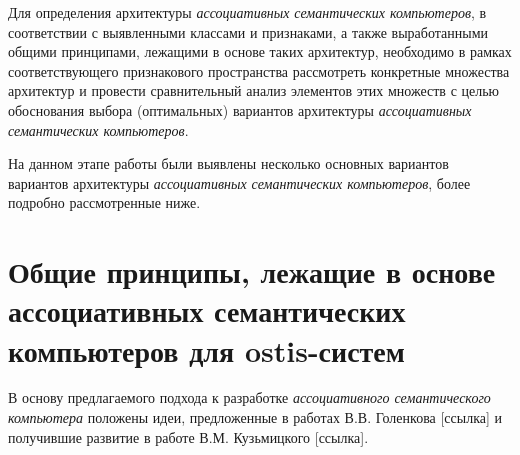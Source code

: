 \begin{SCn}
\begin{scnsubdividing}
\begin{scnindent}
		\end{scnindent}			
	\end{scnsubdividing}
	\begin{scnsubdividing}
		\begin{scnindent}
		\end{scnindent}
	\end{scnsubdividing}
\end{SCn}

Для определения архитектуры \textit{ассоциативных семантических компьютеров}, в соответствии с выявленными классами и признаками, а также выработанными общими принципами, лежащими в основе таких архитектур, необходимо в рамках соответствующего признакового пространства рассмотреть конкретные множества архитектур и провести сравнительный анализ элементов этих множеств с целью обоснования выбора (оптимальных) вариантов архитектуры \textit{ассоциативных семантических компьютеров}.

На данном этапе работы были выявлены несколько основных вариантов вариантов архитектуры \textit{ассоциативных семантических компьютеров}, более подробно рассмотренные ниже.

\section{Общие принципы, лежащие в основе ассоциативных семантических компьютеров для ostis-систем}

В основу предлагаемого подхода к разработке \textit{ассоциативного семантического компьютера} положены идеи, предложенные в работах В.В. Голенкова [ссылка] и получившие развитие в работе В.М. Кузьмицкого [ссылка].

